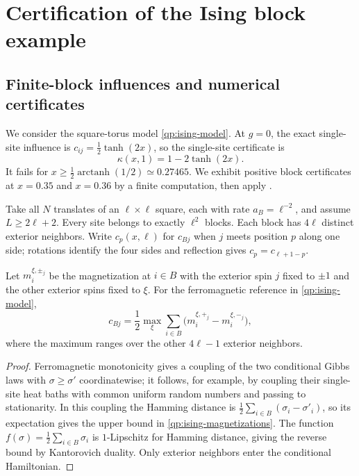 
\section{Certification of the Ising block example}
\label{app:ising-certification}

\subsection{Finite-block influences and numerical certificates}
\label{app:ising-blocks}

We consider the square-torus model \eqref{qp:ising-model}.
At $g=0$, the exact single-site influence is
$c_{ij}=\frac12\tanh(2x)$, so the single-site certificate is
\begin{equation}
 \kappa(x,1)=1-2\tanh(2x).
 \label{qp:ising-singleton}
\end{equation}
It fails for $x\ge\frac12\operatorname{arctanh}(1/2)\simeq0.27465$.
We exhibit positive block certificates at $x=0.35$ and $x=0.36$ by
a finite computation, then apply .

Take all $N$ translates of an $\ell\times\ell$ square, each with
rate $a_B=\ell^{-2}$, and assume $L\ge2\ell+2$.
Every site belongs to exactly $\ell^2$ blocks. Each block has
$4\ell$ distinct exterior neighbors. Write $c_p(x,\ell)$ for
$c_{Bj}$ when $j$ meets position $p$ along one side;
rotations identify the four sides and reflection gives
$c_p=c_{\ell+1-p}$.

\begin{lemma}
\label{qp:ising-influence}
Let $m_i^{\xi,\pm_j}$ be the magnetization at $i\in B$ with the
exterior spin $j$ fixed to $\pm1$ and the other exterior spins fixed
to $\xi$. For the ferromagnetic reference in \eqref{qp:ising-model},
\begin{equation}
 c_{Bj}=\frac12\max_\xi\sum_{i\in B}
       \bigl(m_i^{\xi,+_j}-m_i^{\xi,-_j}\bigr),
 \label{qp:ising-magnetizations}
\end{equation}
where the maximum ranges over the other $4\ell-1$ exterior neighbors.
\end{lemma}
\begin{proof}
Ferromagnetic monotonicity gives a coupling of the two conditional
Gibbs laws with $\sigma\ge\sigma'$ coordinatewise; it follows, for
example, by coupling their single-site heat baths with common uniform
random numbers and passing to stationarity. In this coupling the
Hamming distance is $\frac12\sum_{i\in B}(\sigma_i-\sigma'_i)$,
so its expectation gives the upper bound in
\eqref{qp:ising-magnetizations}. The function
$f(\sigma)=\frac12\sum_{i\in B}\sigma_i$ is $1$-Lipschitz for
Hamming distance, giving the reverse bound by Kantorovich duality.
Only exterior neighbors enter the conditional Hamiltonian.
\end{proof}

